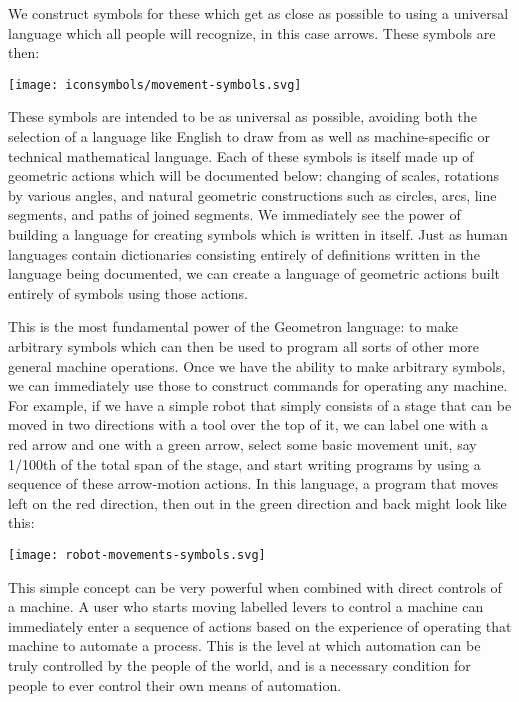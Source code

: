 We construct symbols for these which get as close as possible to using a
universal language which all people will recognize, in this case arrows.
These symbols are then:

\texttt{[image: iconsymbols/movement-symbols.svg]}

These symbols are intended to be as universal as possible, avoiding both
the selection of a language like English to draw from as well as
machine-specific or technical mathematical language. Each of these
symbols is itself made up of geometric actions which will be documented
below: changing of scales, rotations by various angles, and natural
geometric constructions such as circles, arcs, line segments, and paths
of joined segments. We immediately see the power of building a language
for creating symbols which is written in itself. Just as human languages
contain dictionaries consisting entirely of definitions written in the
language being documented, we can create a language of geometric actions
built entirely of symbols using those actions.

This is the most fundamental power of the Geometron language: to make
arbitrary symbols which can then be used to program all sorts of other
more general machine operations. Once we have the ability to make
arbitrary symbols, we can immediately use those to construct commands
for operating any machine. For example, if we have a simple robot that
simply consists of a stage that can be moved in two directions with a
tool over the top of it, we can label one with a red arrow and one with
a green arrow, select some basic movement unit, say 1/100th of the total
span of the stage, and start writing programs by using a sequence of
these arrow-motion actions. In this language, a program that moves left
on the red direction, then out in the green direction and back might
look like this:

\texttt{[image: robot-movements-symbols.svg]}

This simple concept can be very powerful when combined with direct
controls of a machine. A user who starts moving labelled levers to
control a machine can immediately enter a sequence of actions based on
the experience of operating that machine to automate a process. This is
the level at which automation can be truly controlled by the people of
the world, and is a necessary condition for people to ever control their
own means of automation.

